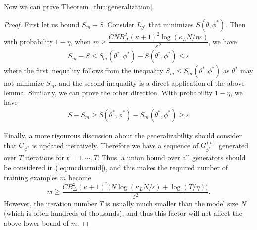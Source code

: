 Now we can prove Theorem~\ref{thm:generalization}.
\begin{proof}
First let us bound $S_m-S$.  Consider $L_{\theta^*}$ that minimizes $S(\theta,\phi^*)$. Then with probability $1-\eta$, when $m\geq\dfrac{C N B_\Delta^2(\kappa+1)^2\log(\kappa_L N/\eta\varepsilon)}{\varepsilon^2}$, we have
\[
\begin{aligned}
S_m - S \leq S_m(\theta^*,\phi^*) - S(\theta^*,\phi^*)\leq\varepsilon
\end{aligned}
\]
where the first inequality follows from the inequality $S_m\leq S_m(\theta^*,\phi^*)$ as $\theta^*$ may not minimize $S_m$, and the second inequality is a direct application of the above lemma.
Similarly, we can prove the other direction. With probability $1-\eta$, we have
\[
\begin{aligned}
S - S_m \geq S(\theta^*,\phi^*)- S_m(\theta^*,\phi^*) \geq\varepsilon
\end{aligned}
\]


Finally, a more rigourous discussion about the generalizability should consider that $G_{\phi^*}$ is updated iteratively. Therefore we have a sequence of $G_{\phi^*}^{(t)}$ generated over $T$ iterations for $t=1,\cdots,T$.  Thus, a union bound over all generators should be considered in (\ref{eq:mcdiarmid}), and this makes the required number of training examples $m$ become
$$
m\geq\dfrac{C B_\Delta^2(\kappa+1)^2 \big(N \log(\kappa_L N/\varepsilon)+\log(T/\eta)\big)}{\varepsilon^2}.
$$
However, the iteration number $T$ is usually much smaller than the model size $N$ (which is often hundreds of thousands), and thus this factor will not affect the above lower bound of $m$.
\end{proof}


